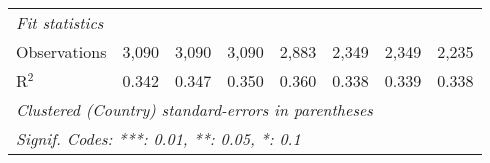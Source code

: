 \begin{tabular}{lccccccc}
   \midrule \emph{Fit statistics}\\
   Observations                                                                           & 3,090   & 3,090       & 3,090        & 2,883        & 2,349         & 2,349         & 2,235\\  
   R$^2$                                                                                  & 0.342   & 0.347       & 0.350        & 0.360        & 0.338         & 0.339         & 0.338\\  
   \midrule
   \multicolumn{8}{l}{\emph{Clustered (Country) standard-errors in parentheses}}\\
   \multicolumn{8}{l}{\emph{Signif. Codes: ***: 0.01, **: 0.05, *: 0.1}}\\
\end{tabular}
\par\endgroup


